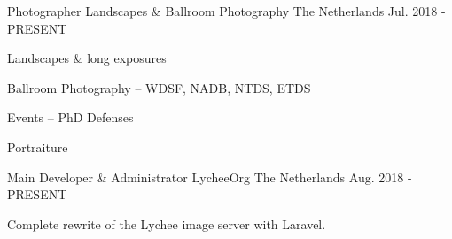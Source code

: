 \begin{cventries}
    \cventry
      {Photographer} %
      {Landscapes \& Ballroom Photography} %
      {The Netherlands} %
      {Jul. 2018 - PRESENT} %
      {
        \begin{cvitems}
          \item Landscapes \& long exposures
          \item Ballroom Photography -- WDSF, NADB, NTDS, ETDS
          \item Events -- PhD Defenses
          \item Portraiture
        \end{cvitems}
      }
  \cventry
    {Main Developer \& Administrator} %
    {LycheeOrg} %
    {The Netherlands} %
    {Aug. 2018 - PRESENT} %
    {
      \begin{cvitems} %
        \item {Complete rewrite of the Lychee image server with Laravel.}
      \end{cvitems}
    }

\end{cventries}

